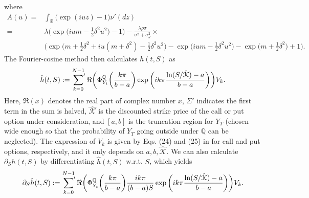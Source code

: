 \documentclass[11pt]{article}
\newcommand{\1}{\mathbbm{1}}
\begin{document}
where
\begin{align}
	A(u)=&\int_{\mathbb{R}}\big(\exp(iuz)-1\big)\nu'(dz)\\
	=& \lambda\bigg(\exp\bigg(ium-\frac{1}{2}\delta^2u^2\bigg) -1\bigg) - \frac{\lambda\rho\sigma}{\sigma^2+\sigma_J^2}\times\\
	&\bigg(\exp\bigg(m +\frac{1}{2}\delta^2 + iu(m+\delta^2)-\frac{1}{2}\delta^2u^2\bigg) -\exp\bigg(ium - \frac{1}{2}\delta^2u^2\bigg) -\exp\bigg(m +\frac{1}{2}\delta^2\bigg)+1\bigg).
\end{align}
The Fourier-cosine method then calculates $h(t,S)$ as
\begin{equation}\label{eq:FCos-h}
	\hat{h}(t,S) := \sideset{}{'}\sum_{k=0}^{N-1} \Re\bigg(\Phi_{Y_t}^{\mathbb{Q}}\bigg(\frac{k\pi}{b-a}\bigg)\exp\bigg(ik\pi\frac{\ln(S/\hat{\mathcal{K}})-a}{b-a}\bigg)\bigg) V_k.
\end{equation}
Here, $\Re(x)$ denotes the real part of complex number $x$, $\Sigma'$ indicates the first term in the sum is halved, $\hat{\mathcal{K}}$ is the discounted strike price of the call or put option under consideration, and $[a,b]$ is the truncation region for $Y_T$ (chosen wide enough so that the probability of $Y_T$ going outside under $\mathbb{Q}$ can be neglected). The expression of $V_k$ is given by Eqs. (24) and (25) in \cite{fang2009novel} for call and put options, respectively, and it only depends on $a, b, \hat{\mathcal{K}}$. We can also calculate $\partial_Sh(t,S)$ by differentiating $\hat{h}(t,S)$ w.r.t. $S$, which yields
\begin{equation}\label{eq:FCos-hS}
	\partial_S\hat{h}(t,S) := \sideset{}{'}\sum_{k=0}^{N-1}  \Re\bigg(\Phi_{Y_t}^{\mathbb{Q}}\bigg(\frac{k\pi}{b-a}\bigg)\frac{ik\pi}{(b-a)S}
\exp\bigg(ik\pi\frac{\ln(S/\hat{\mathcal{K}})-a}{b-a}\bigg)\bigg)V_k.
\end{equation}
\end{document}
